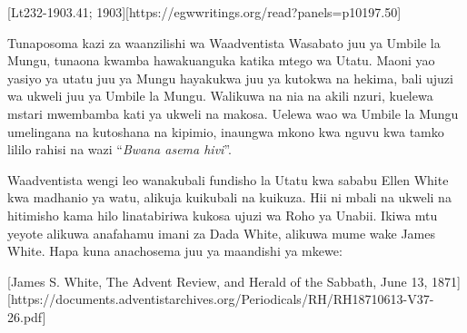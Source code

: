 [Lt232-1903.41; 1903][https://egwwritings.org/read?panels=p10197.50]

Tunaposoma kazi za waanzilishi wa Waadventista Wasabato juu ya Umbile la Mungu, tunaona kwamba hawakuanguka katika mtego wa Utatu. Maoni yao yasiyo ya utatu juu ya Mungu hayakukwa juu ya kutokwa na hekima, bali ujuzi wa ukweli juu ya Umbile la Mungu. Walikuwa na nia na akili nzuri, kuelewa mstari mwembamba kati ya ukweli na makosa. Uelewa wao wa Umbile la Mungu umelingana na kutoshana na kipimio, inaungwa mkono kwa nguvu kwa tamko lililo rahisi na wazi “\textit{Bwana asema hivi}”.

Waadventista wengi leo wanakubali fundisho la Utatu kwa sababu Ellen White kwa madhanio ya watu, alikuja kuikubali na kuikuza. Hii ni mbali na ukweli na hitimisho kama hilo linatabiriwa kukosa ujuzi wa Roho ya Unabii. Ikiwa mtu yeyote alikuwa anafahamu imani za Dada White, alikuwa mume wake James White. Hapa kuna anachosema juu ya maandishi ya mkewe:

[James S. White, The Advent Review, and Herald of the Sabbath, June 13, 1871][https://documents.adventistarchives.org/Periodicals/RH/RH18710613-V37-26.pdf]

